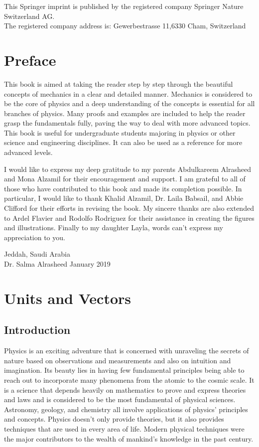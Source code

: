 \documentclass[10pt]{article}
\numberwithin{equation}{section}
\begin{document}
This Springer imprint is published by the registered company Springer Nature Switzerland AG.\\
The registered company address is: Gewerbestrasse 11,6330 Cham, Switzerland

\section*{Preface}
This book is aimed at taking the reader step by step through the beautiful concepts of mechanics in a clear and detailed manner. Mechanics is considered to be the core of physics and a deep understanding of the concepts is essential for all branches of physics. Many proofs and examples are included to help the reader grasp the fundamentals fully, paving the way to deal with more advanced topics. This book is useful for undergraduate students majoring in physics or other science and engineering disciplines. It can also be used as a reference for more advanced levels.

I would like to express my deep gratitude to my parents Abdulkareem Alrasheed and Mona Alzamil for their encouragement and support. I am grateful to all of those who have contributed to this book and made its completion possible. In particular, I would like to thank Khalid Alzamil, Dr. Laila Babsail, and Abbie Clifford for their efforts in revising the book. My sincere thanks are also extended to Ardel Flavier and Rodolfo Rodriguez for their assistance in creating the figures and illustrations. Finally to my daughter Layla, words can't express my appreciation to you.

Jeddah, Saudi Arabia\\
Dr. Salma Alrasheed January 2019

\tableofcontents
\clearpage

\section{Units and Vectors}\label{chap:1}
\subsection{Introduction}\label{sec:1-1}
Physics is an exciting adventure that is concerned with unraveling the secrets of nature based on observations and measurements and also on intuition and imagination. Its beauty lies in having few fundamental principles being able to reach out to incorporate many phenomena from the atomic to the cosmic scale. It is a science that depends heavily on mathematics to prove and express theories and laws and is considered to be the most fundamental of physical sciences. Astronomy, geology, and chemistry all involve applications of physics' principles and concepts. Physics doesn't only provide theories, but it also provides techniques that are used in every area of life. Modern physical techniques were the major contributors to the wealth of mankind's knowledge in the past century.
\end{document}
